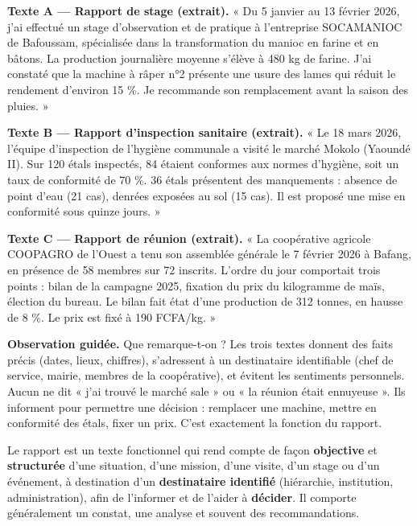 \documentclass[11pt]{article}
\newcommand{\cle}[1]{{\popxbold\color{popdark}#1}}
\newcounter{popsec}
\newcounter{popsub}
\newcommand{\courssub}[1]{%
  \stepcounter{popsub}%
  \par\vspace{9pt}\noindent{\popxbold\fontsize{11.5}{13}\selectfont\color{popink}{\color{poporange}\thepopsec.\thepopsub}\hspace{6pt}#1}\par\nopagebreak\vspace{4pt}
}
\begin{document}
\begin{exemplebox}
\textbf{Texte A — Rapport de stage (extrait).} « Du 5 janvier au 13 février 2026, j'ai effectué un stage d'observation et de pratique à l'entreprise SOCAMANIOC de Bafoussam, spécialisée dans la transformation du manioc en farine et en bâtons. La production journalière moyenne s'élève à 480 kg de farine. J'ai constaté que la machine à râper n°2 présente une usure des lames qui réduit le rendement d'environ 15 \%. Je recommande son remplacement avant la saison des pluies. »

\textbf{Texte B — Rapport d'inspection sanitaire (extrait).} « Le 18 mars 2026, l'équipe d'inspection de l'hygiène communale a visité le marché Mokolo (Yaoundé II). Sur 120 étals inspectés, 84 étaient conformes aux normes d'hygiène, soit un taux de conformité de 70 \%. 36 étals présentent des manquements : absence de point d'eau (21 cas), denrées exposées au sol (15 cas). Il est proposé une mise en conformité sous quinze jours. »

\textbf{Texte C — Rapport de réunion (extrait).} « La coopérative agricole COOPAGRO de l'Ouest a tenu son assemblée générale le 7 février 2026 à Bafang, en présence de 58 membres sur 72 inscrits. L'ordre du jour comportait trois points : bilan de la campagne 2025, fixation du prix du kilogramme de maïs, élection du bureau. Le bilan fait état d'une production de 312 tonnes, en hausse de 8 \%. Le prix est fixé à 190 FCFA/kg. »
\end{exemplebox}

\textbf{Observation guidée.} Que remarque-t-on ? Les trois textes donnent des \cle{faits} précis (dates, lieux, chiffres), s'adressent à un destinataire identifiable (chef de service, mairie, membres de la coopérative), et évitent les sentiments personnels. Aucun ne dit « j'ai trouvé le marché sale » ou « la réunion était ennuyeuse ». Ils informent pour permettre une \cle{décision} : remplacer une machine, mettre en conformité des étals, fixer un prix. C'est exactement la fonction du rapport.

\courssub{Définition du rapport}

\begin{definition}[Le rapport]
Le \cle{rapport} est un \cle{texte fonctionnel} qui rend compte de façon \textbf{objective} et \textbf{structurée} d'une situation, d'une mission, d'une visite, d'un stage ou d'un événement, à destination d'un \textbf{destinataire identifié} (hiérarchie, institution, administration), afin de l'informer et de l'aider à \textbf{décider}. Il comporte généralement un constat, une analyse et souvent des recommandations.
\end{definition}
\end{document}
